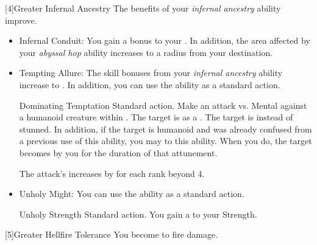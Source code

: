         [4]{Greater Infernal Ancestry} The benefits of your \textit{infernal ancestry} ability improve.
        \begin{itemize}
            \item Infernal Conduit: You gain a  bonus to your .
                In addition, the area affected by your \textit{abyssal hop} ability increases to a \smallarea radius from your destination.
            \item Tempting Allure: The skill bonuses from your \textit{infernal ancestry} ability increase to .
                In addition, you can use the  ability as a standard action.
                \begin{magicalactiveability}{Dominating Temptation}{}
                    \abilityusagetime Standard action.
                    \rankline
                    \noindent
                    Make an attack vs. Mental against a humanoid creature within \shortrange.%
                    \vspace{0.25em}
                    \hit The target is \stunned as a .
                    \crit The target is \confused instead of stunned.
                    In addition, if the target is humanoid and was already confused from a previous use of this ability, you may  to this ability.
                    When you do, the target becomes \dominated by you for the duration of that attunement.

                    \rankline
                    \noindent The attack's  increases by  for each rank beyond 4.
                    \vspace{0.1em}
                \end{magicalactiveability}
            \item Unholy Might: You can use the  ability as a standard action.
                \begin{magicalattuneability}{Unholy Strength}{}
                    \abilityusagetime Standard action.
                    \rankline
                    You gain a   to your Strength.
                \end{magicalattuneability}
        \end{itemize}

        [5]{Greater Hellfire Tolerance} You become  to fire damage.

